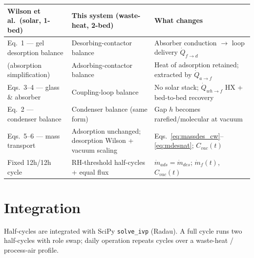 \documentclass[11pt]{article}
\begin{document}
\begin{table}[h]
\centering
\small
\begin{tabular}{@{}p{}p{}p{}@{}}
\toprule
\textbf{Wilson et al.\ (solar, 1-bed)} & \textbf{This system (waste-heat, 2-bed)} & \textbf{What changes} \\
\midrule
Eq.\ 1 --- gel desorption balance & Desorbing-contactor balance & Absorber conduction $\to$ loop delivery $\dot{Q}_{f\to d}$ \\
(absorption simplification) & Adsorbing-contactor balance & Heat of adsorption retained; extracted by $\dot{Q}_{a\to f}$ \\
Eqs.\ 3--4 --- glass \& absorber & Coupling-loop balance & No solar stack; $\dot{Q}_{wh\to f}$ HX + bed-to-bed recovery \\
Eq.\ 2 --- condenser balance & Condenser balance (same form) & Gap $h$ becomes rarefied/molecular at vacuum \\
Eqs.\ 5--6 --- mass transport & Adsorption unchanged; desorption Wilson + vacuum scaling & Eqs.~\eqref{eq:massdes_cw}--\eqref{eq:mdesnat}; $C_{vac}(t)$ \\
Fixed 12h/12h cycle & RH-threshold half-cycles + equal flux & $\dot{m}_{ads}=\dot{m}_{des}$; $\dot{m}_f(t)$, $C_{vac}(t)$ \\
\bottomrule
\end{tabular}
\end{table}

\section*{Integration}

Half-cycles are integrated with SciPy \texttt{solve\_ivp} (Radau). A full cycle runs two half-cycles with role swap; daily operation repeats cycles over a waste-heat / process-air profile.
\end{document}
